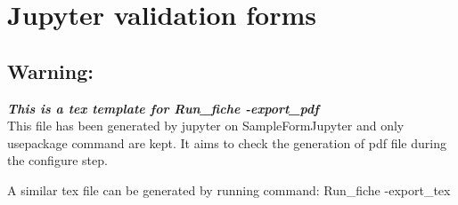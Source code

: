 \documentclass[11pt]{article}
\begin{document}
\section{Jupyter validation forms}
\subsection{Warning:}
\textit{\textbf{This is a tex template for Run\_fiche -export\_pdf}} \\
This file has been generated by jupyter on SampleFormJupyter and only usepackage command are kept. It aims to check the generation of pdf file during the configure step.

A similar tex file can be generated by running command: Run\_fiche -export\_tex
\end{document}
